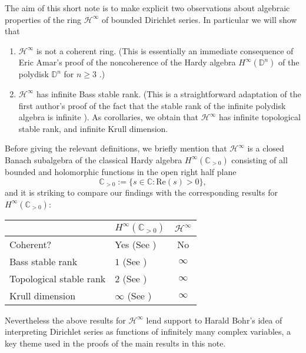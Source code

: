\documentclass[11pt,reqno]{amsart}
\numberwithin{equation}{section}
\theoremstyle{definition}
\theoremstyle{definition}
\theoremstyle{definition}
\begin{document}
The aim of this short note is to make explicit two observations about
algebraic properties of the ring ${{{\mathscr{H}}^{\infty}}}$ of bounded Dirichlet series.
In particular we will show that
\begin{enumerate}
\item ${{{\mathscr{H}}^{\infty}}}$ is not a coherent ring. (This is essentially an immediate
  consequence of Eric Amar's proof of the noncoherence of the Hardy
  algebra $H^\infty({\mathbb{D}}^n)$ of the polydisk ${\mathbb{D}}^n$ for $n\geq 3$ \cite{Ama}.)
\item ${{{\mathscr{H}}^{\infty}}}$ has infinite Bass stable rank. (This is a straightforward
  adaptation of the first author's proof of the fact that the
  stable rank of the infinite polydisk algebra is infinite \cite{Mor}). As corollaries, we
  obtain that ${{{\mathscr{H}}^{\infty}}}$ has infinite topological stable rank, and infinite
  Krull dimension.
\end{enumerate}
Before giving the relevant definitions, we briefly mention that ${{{\mathscr{H}}^{\infty}}}$ is 
a closed Banach subalgebra of the classical Hardy algebra 
$H^{\infty}({\mathbb{C}}_{\scriptscriptstyle >0})$ consisting of all 
bounded and holomorphic functions in the open right half plane 
$$
{\mathbb{C}}_{\scriptscriptstyle >0}:= \{s\in {\mathbb{C}}:\textrm{Re}(s)>0\},
$$
and it is striking to compare our findings with the corresponding results 
for $H^{\infty}({\mathbb{C}}_{\scriptscriptstyle >0})$:

\begin{center}
\begin{tabular}{|l||l|c|}\hline
  &  $H^\infty({\mathbb{C}}_{\scriptscriptstyle >0})$ & ${{{\mathscr{H}}^{\infty}}}$\\ \hline\hline
 Coherent? & Yes (See \cite{McVRub}) & No \\ \hline 
 Bass stable rank & $1$ \phantom{aa}(See \cite{Tre}) & $\infty$ \\ \hline
 Topological stable rank & $2$\phantom{aa} (See \cite{Sua}) & $\infty$ \\ \hline 
 Krull dimension & $\infty$\phantom{a} (See \cite{von}) & $\infty$ \\ \hline
\end{tabular}
\end{center}

\medskip 

\noindent Nevertheless the above results for ${{{\mathscr{H}}^{\infty}}}$ lend support to Harald Bohr's 
idea of interpreting Dirichlet series as functions of infinitely many 
complex variables, a key theme used in the proofs of the main results 
in this note.
\end{document}
